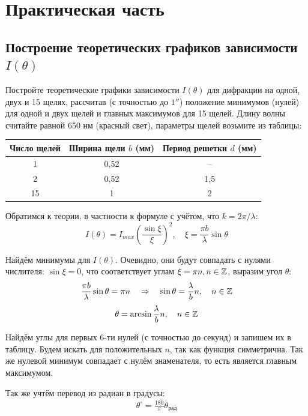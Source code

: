 \section{Практическая часть}

\subsection{Построение теоретических графиков зависимости $I(\theta)$}
 Постройте теоретические графики зависимости $I(\theta)$ для дифракции на одной, двух и 15 щелях, рассчитав (с точностью до $1''$) положение минимумов (нулей) для одной и двух щелей и главных максимумов для 15 щелей. Длину волны считайте равной 650 нм (красный свет), параметры щелей возьмите из таблицы:

\begin{table}[H]
	\centering
	\begin{tabular}{ccc}
		\toprule
		Число щелей & Ширина щели $b$ (мм) & Период решетки $d$ (мм) \\
		\midrule
		1  & 0,52 & -- \\
		2  & 0,52 & 1,5 \\
		15 & 1    & 2 \\
		\bottomrule
	\end{tabular}
\end{table}

Обратимся к теории, в частности к формуле с учётом, что $k = 2 \pi / \lambda$:
\[
I(\theta) = I_{max}\left( \frac{\sin \xi}{\xi} \right)^2, \quad \xi = \frac{\pi b}{\lambda} \sin \theta
\]

Найдём минимумы для $I(\theta)$. Очевидно, они будут совпадать с нулями числителя: $\sin \xi = 0$, что соответствует углам $\xi = \pi n, n \in \mathbb{Z}$, выразим угол $\theta$:
\[
\frac{\pi b}{\lambda} \sin \theta = \pi n 
\quad \Rightarrow \quad 
\sin \theta = \frac{\lambda}{b} n
, \quad n \in \mathbb{Z}
\]
\begin{align} \label{theta-theory}
	\theta = \arcsin{\frac{\lambda}{b}n}, \quad n \in \mathbb{Z}
\end{align}

Найдём углы для первых 6-ти нулей (с точностью до секунд) и запишем их в таблицу. Будем искать для положительных $n$, так как функция симметрична. Так же нулевой минимум совпадает с нулём знаменателя, то есть является главным максимумом. 

Так же учтём перевод из радиан в градусы:
\begin{align} \label{coef-angle}
	\theta^\circ = \frac{180}{\pi} \theta_{\text{рад}}
\end{align}

